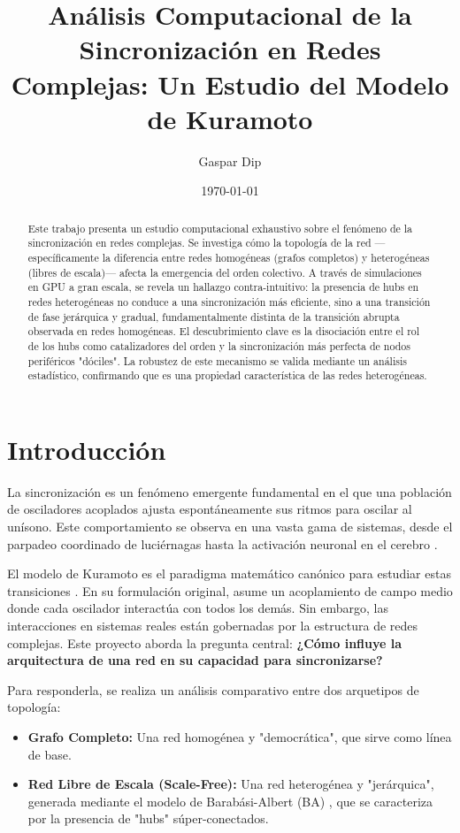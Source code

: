 \documentclass[12pt, a4paper]{article}
\title{Análisis Computacional de la Sincronización en Redes Complejas: Un Estudio del Modelo de Kuramoto}
\author{Gaspar Dip}
\date{\today}
\begin{document}
\maketitle

\begin{abstract}
\noindent Este trabajo presenta un estudio computacional exhaustivo sobre el fenómeno de la sincronización en redes complejas. Se investiga cómo la topología de la red —específicamente la diferencia entre redes homogéneas (grafos completos) y heterogéneas (libres de escala)— afecta la emergencia del orden colectivo. A través de simulaciones en GPU a gran escala, se revela un hallazgo contra-intuitivo: la presencia de hubs en redes heterogéneas no conduce a una sincronización más eficiente, sino a una transición de fase jerárquica y gradual, fundamentalmente distinta de la transición abrupta observada en redes homogéneas. El descubrimiento clave es la disociación entre el rol de los hubs como catalizadores del orden y la sincronización más perfecta de nodos periféricos "dóciles". La robustez de este mecanismo se valida mediante un análisis estadístico, confirmando que es una propiedad característica de las redes heterogéneas.
\end{abstract}

\newpage
\tableofcontents
\newpage

\section{Introducción}

La sincronización es un fenómeno emergente fundamental en el que una población de osciladores acoplados ajusta espontáneamente sus ritmos para oscilar al unísono. Este comportamiento se observa en una vasta gama de sistemas, desde el parpadeo coordinado de luciérnagas hasta la activación neuronal en el cerebro \cite{Strogatz2003}.

El modelo de Kuramoto es el paradigma matemático canónico para estudiar estas transiciones \cite{Kuramoto1975}. En su formulación original, asume un acoplamiento de campo medio donde cada oscilador interactúa con todos los demás. Sin embargo, las interacciones en sistemas reales están gobernadas por la estructura de redes complejas. Este proyecto aborda la pregunta central: \textbf{¿Cómo influye la arquitectura de una red en su capacidad para sincronizarse?}

Para responderla, se realiza un análisis comparativo entre dos arquetipos de topología:
\begin{itemize}
    \item \textbf{Grafo Completo:} Una red homogénea y "democrática", que sirve como línea de base.
    \item \textbf{Red Libre de Escala (Scale-Free):} Una red heterogénea y "jerárquica", generada mediante el modelo de Barabási-Albert (BA) \cite{Barabasi1999}, que se caracteriza por la presencia de "hubs" súper-conectados.
\end{itemize}
\end{document}
